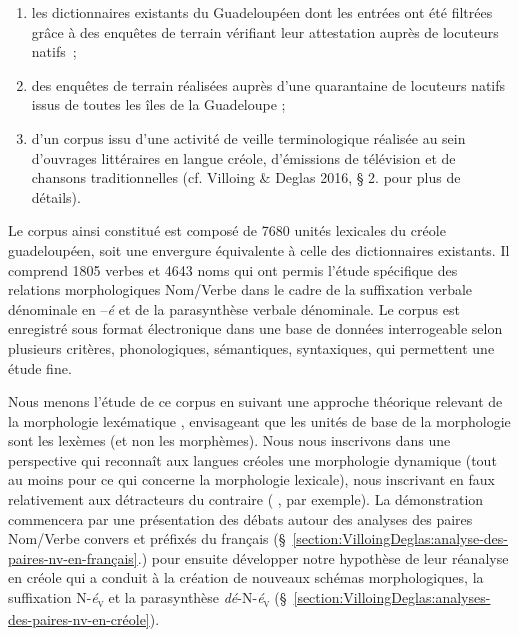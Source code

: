 \documentclass[output=paper]{langsci/langscibook}
\begin{document}
\begin{enumerate}\def\labelenumi{(\roman{enumi})}
\item
  les dictionnaires existants du Guadeloupéen %
\citep{Ludwig12,Poullet84,Tourneux90} %
%
dont
  les entrées ont été filtrées grâce à des enquêtes de terrain vérifiant
  leur attestation auprès de locuteurs natifs~;
\item
  des enquêtes de terrain réalisées auprès d'une quarantaine de
  locuteurs natifs issus de toutes les îles de la Guadeloupe ;
\item
  d'un corpus issu d'une activité de veille terminologique réalisée au
  sein d'ouvrages littéraires en langue créole, d'émissions de
  télévision et de chansons traditionnelles (cf. Villoing \& Deglas
  2016, § 2. pour plus de détails).~
\end{enumerate}

Le corpus ainsi constitué est composé de 7680 unités lexicales du créole
guadeloupéen, soit une envergure équivalente à celle des dictionnaires
existants. Il comprend 1805 verbes et 4643 noms qui ont permis l'étude
spécifique des relations morphologiques Nom/Verbe dans le cadre de la
suffixation verbale dénominale en --\emph{é} et de la parasynthèse
verbale dénominale. Le corpus est enregistré sous format électronique
dans une base de données interrogeable selon plusieurs critères,
phonologiques, sémantiques, syntaxiques, qui permettent une étude fine.

Nous menons l'étude de ce corpus en suivant une approche théorique
relevant de la morphologie lexématique %
\citep[cf. par ex.][]{Matthews91,Aronoff94,Anderson92,Fradin03,Booij10}%
%
, envisageant que
les unités de base de la morphologie sont les lexèmes (et non les
morphèmes). Nous nous inscrivons dans une perspective qui reconnaît aux
langues créoles une morphologie dynamique (tout au moins pour ce qui
concerne la morphologie lexicale), nous inscrivant en faux relativement
aux détracteurs du contraire %
(%
\citealt{Valdman78,Seuren86,McWhorter1998}%
%
, par exemple).
%
La démonstration commencera par une
présentation des débats autour des analyses des paires Nom/Verbe convers
et préfixés du français (§~\ref{section:VilloingDeglas:analyse-des-paires-nv-en-français}.) pour ensuite développer notre hypothèse
de leur réanalyse en créole qui a conduit à la création de nouveaux
schémas morphologiques, la suffixation N-\emph{é}\textsubscript{\textsc{v}} et la
parasynthèse \emph{dé}-N-\emph{é}\textsubscript{\textsc{v}} (§~\ref{section:VilloingDeglas:analyses-des-paires-nv-en-créole}).
\end{document}
